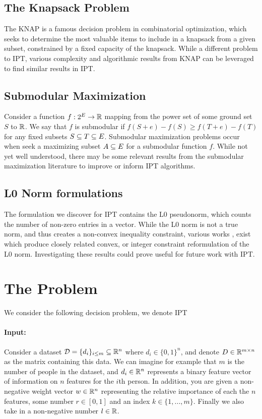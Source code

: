 \documentclass[12pt]{article}
\begin{document}
\subsection{The Knapsack Problem}
The \gls{KNAP} \cite{KelPfePis04} \cite{salkin1975knapsack} is a famous decision problem in combinatorial optimization, which seeks to determine the most valuable items to include in a knapsack from a given subset, constrained by a fixed capacity of the knapsack. While a different problem to \gls{IPT}, various complexity and algorithmic results from \gls{KNAP} can be leveraged to find similar results in \gls{IPT}.



\subsection{Submodular Maximization}
Consider a function $f:2^E \to \mathbb{R}$ mapping from the power set of some ground set $S$ to $\mathbb{R}$. We say that $f$ is submodular if $f(S + e) - f(S) \geq f(T+ e)-f(T)$ for any fixed subsets $S \subseteq T \subseteq E$. Submodular maximization \cite{krause2014submodular}\cite{mccormick2005submodular} problems occur when seek a maximizing subset $A \subseteq E$ for a submodular function $f$. While not yet well understood, there may be some relevant results from the submodular maximization literature to improve or inform \gls{IPT} algorithms.   

\subsection{L0 Norm formulations}
The formulation we discover for \gls{IPT} contains the L0 pseudonorm, which counts the number of non-zero entries in a vector. While the L0 norm is not a true norm, and thus creates a non-convex inequality constraint, various works \cite{Alper} \cite{feng2013complementarity}, exist which produce closely related convex, or integer constraint reformulation of the L0 norm. Investigating these results could prove useful for future work with \gls{IPT}.


\section{The Problem}
We consider the following decision problem, we denote \gls{IPT}
\paragraph{Input:}
Consider a dataset $\mathcal{D} = \{d_i\}_{i\leq m} \subseteq \mathbb{R}^n$ where $d_i \in \{0,1\}^n$, and denote $D\in \mathbb{R}^{m\times n}$ as the matrix containing this data. We can imagine for example that $m$ is the number of people in the dataset, and $d_i\in \mathbb{R}^n$ represents a binary feature vector of information on $n$ features for the $i$th person. In addition, you are given a non-negative weight vector $w\in \mathbb{R}^n$ representing the relative importance of each the $n$ features, some number $r \in [0,1]$ and an index $k \in \{1,...,m\}$. Finally we also take in a non-negative number $l \in \mathbb{R}$. 
\end{document}
